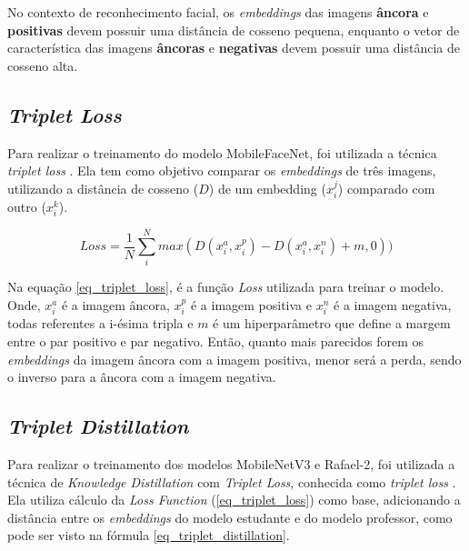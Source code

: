 No contexto de reconhecimento facial, os \textit{embeddings} das imagens \textbf{âncora} e \textbf{positivas}
devem possuir uma distância de cosseno pequena, enquanto o vetor de característica das imagens
\textbf{âncoras} e \textbf{negativas} devem possuir uma distância de cosseno alta.

\subsection{\textit{Triplet Loss}}
Para realizar o treinamento do modelo MobileFaceNet, foi utilizada a técnica \textit{triplet loss}
\cite{triplet_distillation_face_recognition}. Ela tem como objetivo comparar os \textit{embeddings} de três imagens,
utilizando a distância de cosseno ($D$) de um embedding ($x_i^j$) comparado com outro ($x_i^k$).

\begin{equation}\label{eq_triplet_loss}
	Loss = \frac 1 N \sum _i ^N max(D(x_i^a, x_i^p) - D(x_i^a, x_i^n) + m, 0))
\end{equation}
%
%

Na equação \ref{eq_triplet_loss}, é a função \textit{Loss} utilizada para treinar o modelo. Onde, $x_i^a$ é
a imagem âncora, $x_i^p$ é a imagem positiva e $x_i^n$ é a imagem negativa, todas referentes a i-ésima
tripla e $m$ é um hiperparâmetro que define a margem entre o par positivo e par negativo.
Então, quanto mais parecidos forem os \textit{embeddings} da imagem âncora com a imagem positiva,
menor será a perda, sendo o inverso para a âncora com a imagem negativa.

\subsection{\textit{Triplet Distillation}}
Para realizar o treinamento dos modelos MobileNetV3 e Rafael-2, foi utilizada a técnica de
\textit{Knowledge Distillation} \cite{hinton2015distilling} com \textit{Triplet Loss}, conhecida como
\textit{triplet loss} \cite{triplet_distillation_face_recognition}.
Ela utiliza cálculo da \textit{Loss Function} (\ref{eq_triplet_loss}) como base, adicionando a distância entre os
\textit{embeddings} do modelo estudante e do modelo professor, como pode ser visto na fórmula
\ref{eq_triplet_distillation}.

